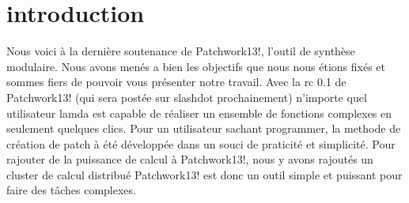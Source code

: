 \chapter{introduction}
Nous voici \`a la derni\`ere soutenance de Patchwork13!, l'outil de synth\`ese 
modulaire. Nous avons men\'es a bien les objectifs que nous nous \'etions 
fix\'es et sommes fiers de pouvoir vous pr\'esenter notre travail. 
Avec la rc 0.1 de Patchwork13! (qui sera post\'ee sur slashdot prochainement)
n'importe quel utilisateur lamda est capable de r\'ealiser un ensemble de 
fonctions complexes en seulement quelques clics. Pour un utilisateur sachant
programmer, la methode de cr\'eation de patch \`a \'et\'e d\'evelopp\'ee 
dans un souci de praticit\'e et simplicit\'e. Pour rajouter de la puissance de
calcul \`a Patchwork13!, nous y avons rajout\'es un cluster de calcul 
distribu\'e
Patchwork13! est donc un outil simple et puissant pour faire des t\^aches 
complexes.